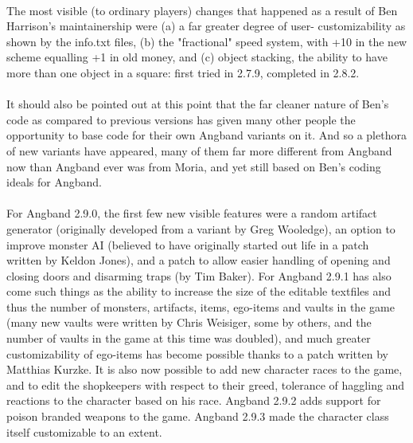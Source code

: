\paragraph{}The most visible (to ordinary players) changes that happened as a result of 
Ben Harrison's maintainership were (a) a far greater degree of user-
customizability as shown by the info.txt files, (b) the "fractional" speed
system, with +10 in the new scheme equalling +1 in old money, and
(c) object stacking, the ability to have more than one object in a square:
first tried in 2.7.9, completed in 2.8.2.

\paragraph{}It should also be pointed out at this point that the far cleaner nature of 
Ben's code as compared to previous versions has given many other people the 
opportunity to base code for their own Angband variants on it. And so a 
plethora of new variants have appeared, many of them far more different from 
Angband now than Angband ever was from Moria, and yet still based on Ben's 
coding ideals for Angband.

\paragraph{}For Angband 2.9.0, the first few new visible features were a random artifact 
generator (originally developed from a variant by Greg
Wooledge), an option to 
improve monster AI (believed to have originally started out life in a patch 
written by Keldon Jones), and a patch to allow easier handling of opening and 
closing doors and disarming traps (by Tim Baker). For Angband 2.9.1 has also 
come such things as the ability to increase the size of the editable textfiles
and thus the number of monsters, artifacts, items, ego-items and vaults in 
the game (many new vaults were written by Chris Weisiger, some by others, and 
the number of vaults in the game at this time was doubled), and much greater 
customizability of ego-items has become possible thanks to a patch written by 
Matthias Kurzke. It is also now possible to add new character races to the 
game, and to edit the shopkeepers with respect to their greed, tolerance of 
haggling and reactions to the character based on his race. Angband 2.9.2 adds 
support for poison branded weapons to the game.  Angband 2.9.3 made the
character class itself customizable to an extent.

